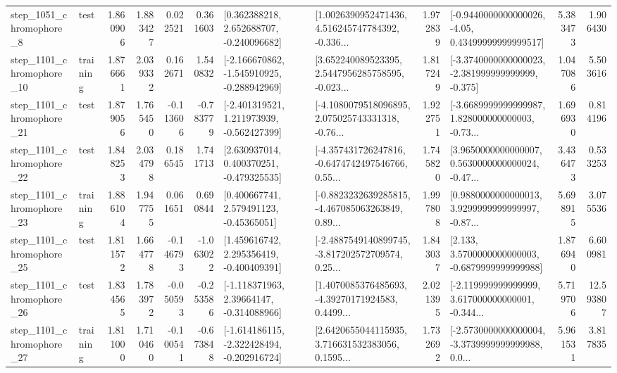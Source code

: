 \begin{tabular}{llrrrrllrlrr}
  step\_1051\_chromophore\_8 &      test &      1.860906 &    1.883427 &      0.022521 &  0.361603 &    [0.362388218, 2.652688707, -0.240096682] &  [1.0026390952471436, 4.516245747784392, -0.336... &       1.972839 &  [-0.9440000000000026, -4.05, 0.43499999999999517] &            5.383473 &          1.906430 \\
 step\_1101\_chromophore\_10 &  training &      1.876661 &    2.039332 &      0.162671 &  1.540832 &  [-2.166670862, -1.545910925, -0.288942969] &  [3.652240089523395, 2.5447956285758595, -0.023... &       1.817249 &  [-3.3740000000000023, -2.381999999999999, -0.375] &            1.047086 &          5.503616 \\
 step\_1101\_chromophore\_21 &      test &      1.879056 &    1.765450 &     -0.113606 & -0.783779 &   [-2.401319521, 1.211973939, -0.562427399] &  [-4.1080079518096895, 2.075025743331318, -0.76... &       1.922751 &  [-3.6689999999999987, 1.828000000000003, -0.73... &            1.696930 &          0.814196 \\
 step\_1101\_chromophore\_22 &      test &      1.848253 &    2.034798 &      0.186545 &  1.741713 &    [2.630937014, 0.400370251, -0.479325535] &  [-4.357431726247816, -0.6474742497546766, 0.55... &       1.745820 &  [3.9650000000000007, 0.5630000000000024, -0.47... &            3.436473 &          0.533253 \\
 step\_1101\_chromophore\_23 &  training &      1.886104 &    1.947755 &      0.061651 &  0.690844 &     [0.400667741, 2.579491123, -0.45365051] &  [-0.8823232639285815, -4.467085063263849, 0.89... &       1.997808 &  [0.9880000000000013, 3.9299999999999997, -0.87... &            5.698915 &          3.075536 \\
 step\_1101\_chromophore\_25 &      test &      1.811572 &    1.664778 &     -0.146793 & -1.063022 &    [1.459616742, 2.295356419, -0.400409391] &  [-2.4887549140899745, -3.817202572709574, 0.25... &       1.843037 &   [2.133, 3.5700000000000003, -0.6879999999999988] &            1.876940 &          6.600981 \\
 step\_1101\_chromophore\_26 &      test &      1.834565 &    1.783972 &     -0.050593 & -0.253586 &    [-1.118371963, 2.39664147, -0.314088966] &  [1.4070085376485693, -4.39270171924583, 0.4499... &       2.021395 &  [-2.119999999999999, 3.617000000000001, -0.344... &            5.719706 &         12.593807 \\
 step\_1101\_chromophore\_27 &  training &      1.811000 &    1.710460 &     -0.100541 & -0.673848 &  [-1.614186115, -2.322428494, -0.202916724] &  [2.6420655044115935, 3.716631532383056, 0.1595... &       1.732692 &  [-2.5730000000000004, -3.3739999999999988, 0.0... &            5.961531 &          3.817835 \\

\end{tabular}
